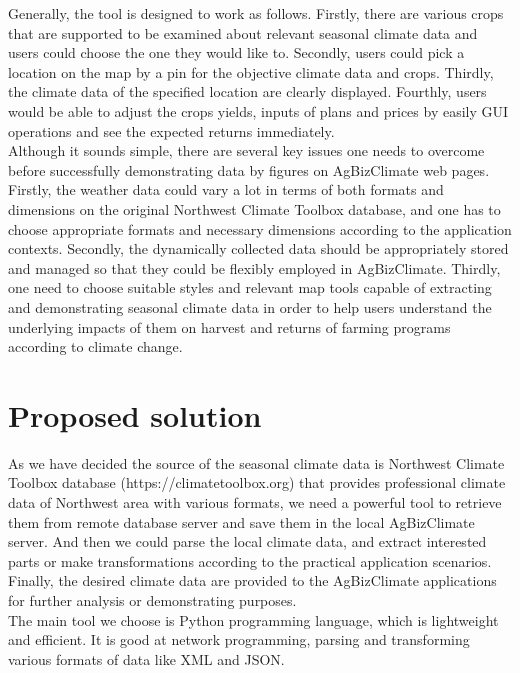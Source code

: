 \documentclass[letterpaper,10pt]{article}
\begin{document}
    Generally, the tool is designed to work as follows. Firstly, there are various crops that are supported to be examined about relevant seasonal climate data and users could choose the one they would like to. Secondly, users could pick a location on the map by a pin for the objective climate data and crops. Thirdly, the climate data of the specified location are clearly displayed. Fourthly, users would be able to adjust the crops yields, inputs of plans and prices by easily GUI operations and see the expected returns immediately.\\

    Although it sounds simple, there are several key issues one needs to overcome before successfully demonstrating data by figures on AgBizClimate web pages. Firstly, the weather data could vary a lot in terms of both formats and dimensions on the original Northwest Climate Toolbox database, and one has to choose appropriate formats and necessary dimensions according to the application contexts. Secondly, the dynamically collected data should be appropriately stored and managed so that they could be flexibly employed in AgBizClimate. Thirdly, one need to choose suitable styles and relevant map tools capable of extracting and demonstrating seasonal climate data in order to help users understand the underlying impacts of them on harvest and returns of farming programs according to climate change.

	  \section*{Proposed solution}
   As we have decided the source of the seasonal climate data is Northwest Climate Toolbox database (https://climatetoolbox.org) that provides professional climate data of Northwest area with various formats, we need a powerful tool to retrieve them from remote database server and save them in the local AgBizClimate server. And then we could parse the local climate data, and extract interested parts or make transformations according to the practical application scenarios. Finally, the desired climate data are provided to the AgBizClimate applications for further analysis or demonstrating purposes.\\

   The main tool we choose is Python programming language, which is lightweight and efficient. It is good at network programming, parsing and transforming various formats of data like XML and JSON.\\
\end{document}
